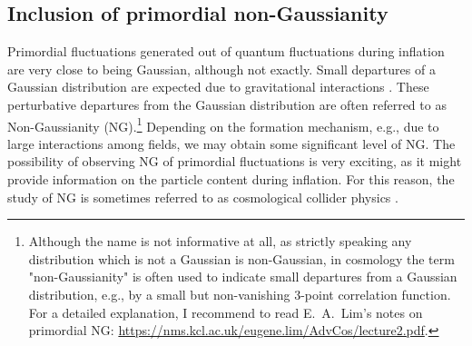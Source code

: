 \documentclass[a4paper,11pt]{article}
\numberwithin{equation}{section}
\begin{document}
\subsection{Inclusion of primordial non-Gaussianity \label{sec:ng}}

Primordial fluctuations generated out of quantum fluctuations during inflation are very close to being Gaussian, although not exactly. Small departures of a Gaussian distribution are expected due to gravitational interactions \cite{Maldacena:2002vr,Koyama:2010xj}. These perturbative departures from the Gaussian distribution are often referred to as Non-Gaussianity (NG).\footnote{Although the name is not informative at all, as strictly speaking any distribution which is not a Gaussian is non-Gaussian, in cosmology the term "non-Gaussianity" is often used to indicate small departures from a Gaussian distribution, e.g., by a small but non-vanishing 3-point correlation function. For a detailed explanation, I recommend to read E.~A.~Lim's notes on primordial NG: \url{https://nms.kcl.ac.uk/eugene.lim/AdvCos/lecture2.pdf}.} Depending on the formation mechanism, e.g., due to large interactions among fields, we may obtain some significant level of NG. The possibility of observing NG of primordial fluctuations is very exciting, as it might provide information on the particle content during inflation. For this reason, the study of NG is sometimes referred to as cosmological collider physics \cite{Arkani-Hamed:2015bza}.
\end{document}
